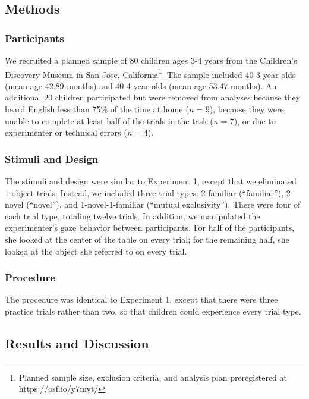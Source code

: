 \documentclass[10pt, letterpaper]{article}
\begin{document}
\subsection{Methods}\label{methods-1}

\subsubsection{Participants}\label{participants-1}

We recruited a planned sample of 80 children ages 3-4 years from the
Children's Discovery Museum in San Jose,
California\footnote{Planned sample size, exclusion criteria, and analysis plan preregistered at https://osf.io/y7mvt/}.
The sample included 40 3-year-olds (mean age 42.89 months) and 40
4-year-olds (mean age 53.47 months). An additional 20 children
participated but were removed from analyses because they heard English
less than 75\% of the time at home (\emph{n} = 9), because they were
unable to complete at least half of the trials in the task (\emph{n} =
7), or due to experimenter or technical errors (\emph{n} = 4).

\subsubsection{Stimuli and Design}\label{stimuli-and-design-1}

The stimuli and design were similar to Experiment 1, except that we
eliminated 1-object trials. Instead, we included three trial types:
2-familiar (``familiar''), 2-novel (``novel''), and 1-novel-1-familiar
(``mutual exclusivity''). There were four of each trial type, totaling
twelve trials. In addition, we manipulated the experimenter's gaze
behavior between participants. For half of the participants, she looked
at the center of the table on every trial; for the remaining half, she
looked at the object she referred to on every trial.

\subsubsection{Procedure}\label{procedure-1}

The procedure was identical to Experiment 1, except that there were
three practice trials rather than two, so that children could experience
every trial type.

\subsection{Results and Discussion}\label{results-and-discussion-1}
\end{document}
